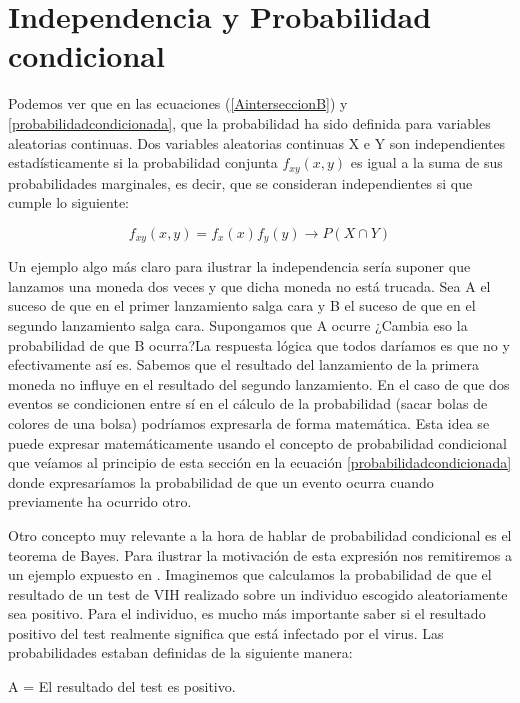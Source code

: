 \section{Independencia y Probabilidad condicional}

Podemos ver que en las ecuaciones (\ref{AinterseccionB}) y \ref{probabilidadcondicionada}, que la probabilidad ha sido definida para variables aleatorias continuas. Dos variables aleatorias continuas X e Y son independientes estadísticamente si la probabilidad conjunta $f_{xy}(x,y)$ es igual a la suma de sus probabilidades marginales, es decir, que se consideran independientes si que cumple lo siguiente:

\begin{equation}\label{sucesosindependientes}
f_{xy}(x,y) = f_{x}(x)f_{y}(y)  \longrightarrow P(X \cap Y)
\end{equation}

Un ejemplo algo más claro para ilustrar la independencia sería suponer que lanzamos una moneda dos veces y que dicha moneda no está trucada. Sea A el suceso de que en el primer lanzamiento salga cara y B el suceso de que en el segundo lanzamiento salga cara. Supongamos que A ocurre ¿Cambia eso la probabilidad de que B ocurra?La respuesta lógica que todos daríamos es que no y efectivamente así es. Sabemos que el resultado del lanzamiento de la primera moneda no influye en el resultado del segundo lanzamiento. En el caso de que dos eventos se condicionen entre sí en el cálculo de la probabilidad (sacar bolas de colores de una bolsa) podríamos expresarla de forma matemática. Esta idea se puede expresar matemáticamente usando el concepto de probabilidad condicional que veíamos al principio de esta sección en la ecuación \ref{probabilidadcondicionada} donde expresaríamos la probabilidad de que un evento ocurra cuando previamente ha ocurrido otro.

Otro concepto muy relevante a la hora de hablar de probabilidad condicional es el teorema de Bayes. Para ilustrar la motivación de esta expresión nos remitiremos a un ejemplo expuesto en \cite{Matematicas2004}. Imaginemos que calculamos la probabilidad de que el resultado de un test de VIH realizado sobre un individuo escogido aleatoriamente sea positivo. Para el individuo, es mucho más importante saber si el resultado positivo del test realmente significa que está infectado por el virus. Las probabilidades estaban definidas de la siguiente manera:

\hspace{3.7cm}A = El resultado del test es positivo.

